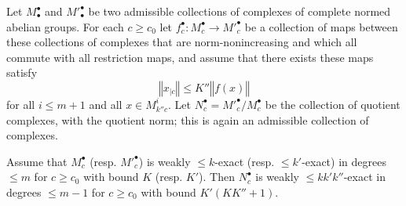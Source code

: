 \begin{proposition}
  \label{weaksnakelemma}
  \leanok
  Let $M^\bullet_\bullet$ and $M'^\bullet_\bullet$ be two admissible collections
  of complexes of complete normed abelian groups.
  For each $c\geq c_0$ let $f^\bullet_c: M^\bullet_c\to M'^\bullet_c$ be a collection of maps
  between these collections of complexes
  that are norm-nonincreasing and which all commute with all restriction maps,
  and assume that there exists these maps satisfy
  \[
    ‖x_{|c}‖ ≤ K''‖f(x)‖
  \]
  for all $i ≤ m+1$ and all $x\in M^i_{k''c}$.
  Let $N^\bullet_c=M'^\bullet_c/M^\bullet_c$
  be the collection of quotient complexes, with the quotient norm;
  this is again an admissible collection of complexes.

  Assume that $M^\bullet_c$ (resp. $M'^\bullet_c$) is weakly $\leq k$-exact
  (resp. $≤ k'$-exact) in degrees $\leq m$ for $c\geq c_0$ with bound $K$
  (resp. $K'$).
  Then $N^\bullet_c$ is weakly $\leq kk'k''$-exact in degrees $\leq m-1$ for $c\geq c_0$
  with bound $K'(KK'' + 1)$.
\end{proposition}

